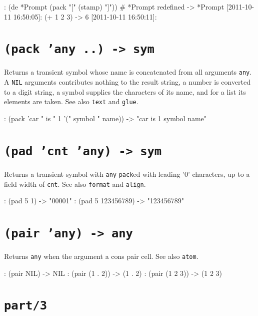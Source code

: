 \begin{wideverbatim}
: (de *Prompt (pack "[" (stamp) "]"))
# *Prompt redefined
-> *Prompt
[2011-10-11 16:50:05]: (+ 1 2 3)
-> 6
[2011-10-11 16:50:11]:
\end{wideverbatim}

 
\section*{\texttt{(pack 'any ..) -> sym}}
\label{sec:func-ref-P-(pack 'any ..) -> sym}


Returns a transient symbol whose name is concatenated from all arguments
\texttt{any}. A \texttt{NIL} arguments contributes nothing to the result string, a
number is converted to a digit string, a symbol supplies the characters
of its name, and for a list its elements are taken. See also \texttt{text} and
\texttt{glue}.


\begin{wideverbatim}
: (pack 'car " is " 1 '(" symbol " name))
-> "car is 1 symbol name"
\end{wideverbatim}

 
\section*{\texttt{(pad 'cnt 'any) -> sym}}
\label{sec:func-ref-P-(pad 'cnt 'any) -> sym}


Returns a transient symbol with \texttt{any} \texttt{pack}ed with
leading '0' characters, up to a field width of \texttt{cnt}. See also
\texttt{format} and \texttt{align}.


\begin{wideverbatim}
: (pad 5 1)
-> "00001"
: (pad 5 123456789)
-> "123456789"
\end{wideverbatim}

 
\section*{\texttt{(pair 'any) -> any}}
\label{sec:func-ref-P-(pair 'any) -> any}


Returns \texttt{any} when the argument a cons pair cell. See also \texttt{atom}.


\begin{wideverbatim}
: (pair NIL)
-> NIL
: (pair (1 . 2))
-> (1 . 2)
: (pair (1 2 3))
-> (1 2 3)
\end{wideverbatim}

 
\section*{\texttt{part/3}}
\label{sec:func-ref-P-part/3}


